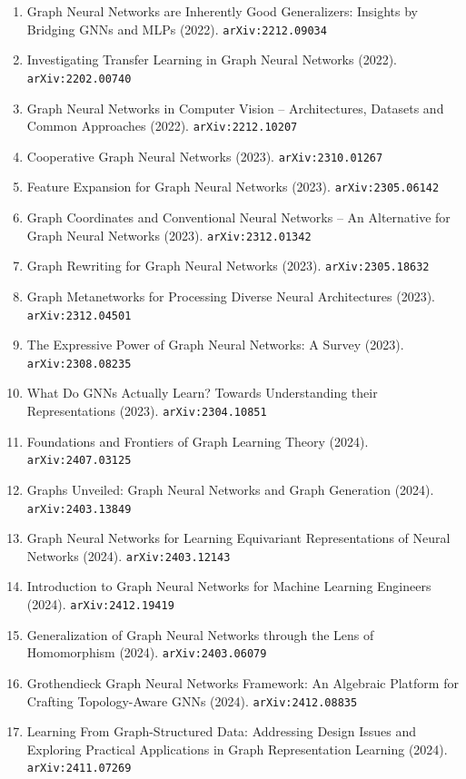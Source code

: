 \documentclass[11pt]{article}
\begin{document}
\begin{enumerate}
  \item Graph Neural Networks are Inherently Good Generalizers: Insights by
  Bridging GNNs and MLPs (2022). \texttt{arXiv:2212.09034}
  \item Investigating Transfer Learning in Graph Neural Networks (2022). \texttt{arXiv:2202.00740}
  \item Graph Neural Networks in Computer Vision -- Architectures, Datasets and
  Common Approaches (2022). \texttt{arXiv:2212.10207}
  \item Cooperative Graph Neural Networks (2023). \texttt{arXiv:2310.01267}
  \item Feature Expansion for Graph Neural Networks (2023). \texttt{arXiv:2305.06142}
  \item Graph Coordinates and Conventional Neural Networks -- An Alternative for
  Graph Neural Networks (2023). \texttt{arXiv:2312.01342}
  \item Graph Rewriting for Graph Neural Networks (2023). \texttt{arXiv:2305.18632}
  \item Graph Metanetworks for Processing Diverse Neural Architectures (2023). \texttt{arXiv:2312.04501}
  \item The Expressive Power of Graph Neural Networks: A Survey (2023). \texttt{arXiv:2308.08235}
  \item What Do GNNs Actually Learn? Towards Understanding their Representations (2023). \texttt{arXiv:2304.10851}
  \item Foundations and Frontiers of Graph Learning Theory (2024). \texttt{arXiv:2407.03125}
  \item Graphs Unveiled: Graph Neural Networks and Graph Generation (2024). \texttt{arXiv:2403.13849}
  \item Graph Neural Networks for Learning Equivariant Representations of Neural
  Networks (2024). \texttt{arXiv:2403.12143}
  \item Introduction to Graph Neural Networks for Machine Learning Engineers (2024). \texttt{arXiv:2412.19419}
  \item Generalization of Graph Neural Networks through the Lens of Homomorphism (2024). \texttt{arXiv:2403.06079}
  \item Grothendieck Graph Neural Networks Framework: An Algebraic Platform for Crafting Topology-Aware GNNs (2024). \texttt{arXiv:2412.08835}
  \item Learning From Graph-Structured Data: Addressing Design Issues and
  Exploring Practical Applications in Graph Representation Learning (2024). \texttt{arXiv:2411.07269}

\end{enumerate}
\end{document}
